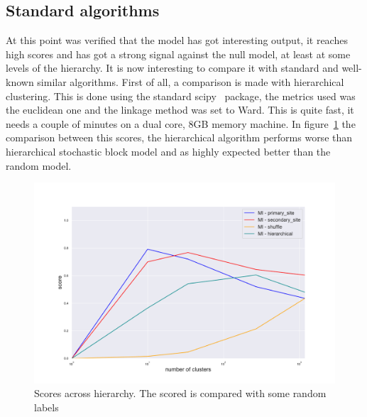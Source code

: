\subsection{Standard algorithms}
At this point was verified that the model has got interesting output, it reaches high scores and has got a strong signal against the null model, at least at some levels of the hierarchy. It is now interesting to compare it with standard and well-known similar algorithms.
First of all, a comparison is made with hierarchical clustering. This is done using the standard scipy~\cite{jones2014scipy} package, the metrics used was the euclidean one and the linkage method was set to Ward. This is quite fast, it needs a couple of minutes on a dual core, 8GB memory machine.
In figure~\ref{fig:topic/gtex/oversigma_10tissue/metric_scores_hier} the comparison between this scores, the hierarchical algorithm performs worse than hierarchical stochastic block model and as highly expected better than the random model.
\begin{figure}[htb!]
    \centering
    \includegraphics[width=0.9\linewidth]{pictures/topic/gtex/oversigma_10tissue/metric_scores_hier.pdf}
    \caption{Scores across hierarchy. The scored is compared with some random labels}
    \label{fig:topic/gtex/oversigma_10tissue/metric_scores_hier}
\end{figure}

